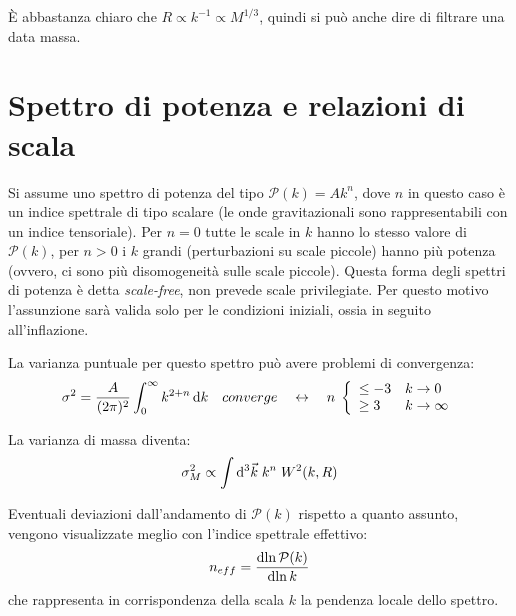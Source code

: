 È abbastanza chiaro che $R\propto k^{-1}\propto M^{1/3}$, quindi si può anche dire di filtrare una data massa.

\section{Spettro di potenza e relazioni di scala}
Si assume uno spettro di potenza del tipo $\mathcal{P}(k) = A k^{n}$, dove $n$ in questo caso è un indice spettrale di tipo scalare (le onde gravitazionali sono rappresentabili con un indice tensoriale). Per $n=0$ tutte le scale in $k$ hanno lo stesso valore di $\mathcal{P}(k)$, per $n>0$ i $k$ grandi (perturbazioni su scale piccole) hanno più potenza (ovvero, ci sono più disomogeneità sulle scale piccole). Questa forma degli spettri di potenza è detta \textit{scale-free}, non prevede scale privilegiate. Per questo motivo l'assunzione sarà valida solo per le condizioni iniziali, ossia in seguito all'inflazione.

La varianza puntuale per questo spettro può avere problemi di convergenza:
\begin{equation} \sigma^2 = \frac{A}{(2\pi)^2}\int_0^\infty  k^{2+n} \operatorname{d}\!{k} \quad converge \quad \leftrightarrow \quad n\; \left\{
    \begin{array}{ll}
    \leq -3 & k\rightarrow 0 \\
    \geq3 & k\rightarrow \infty
\end{array}\right.
\end{equation}

La varianza di massa diventa:
\begin{equation}
    \sigma_M^2 \propto \int \operatorname{d}\!{^3 \vec{k}}\; k^n\; W^2(k,R)
\end{equation}

Eventuali deviazioni dall'andamento di $\mathcal{P}(k)$ rispetto a quanto assunto, vengono visualizzate meglio con l'indice spettrale effettivo:
\begin{equation}
    n_{eff}=\frac{\operatorname{d}\!{\ln \mathcal{P}(k)}}{\operatorname{d}\!{\ln k}}
\end{equation}
che rappresenta in corrispondenza della scala $k$ la pendenza locale dello spettro.

